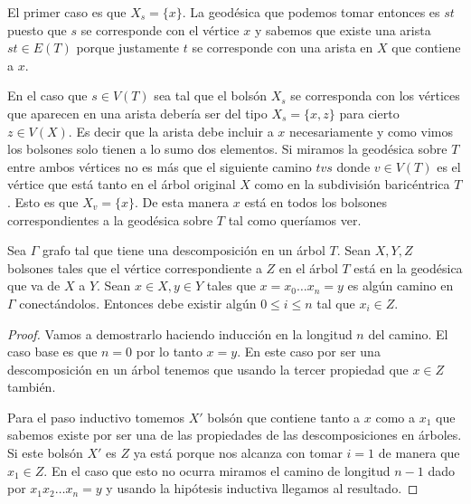 \documentclass[tesis.tex]{subfiles}
\begin{document}
\begin{obs}
\begin{enumerate}
	El primer caso es que $X_s = \{ x \}$.
	La geodésica que podemos tomar entonces es $st$ puesto que $s$ se corresponde con el vértice $x$ y sabemos que existe una arista $st \in E(T)$ porque justamente $t$ se corresponde con una arista en $X$ que contiene a $x$.
	
	En el caso que $s \in V(T)$ sea tal que el bolsón $X_s$ se corresponda con los vértices que aparecen en una arista debería ser del tipo $X_s = \{x,z\}$ para cierto $z \in V(X)$. 
	Es decir que la arista debe incluir a $x$ necesariamente y como vimos los bolsones solo tienen a lo sumo dos elementos.
	Si miramos la geodésica sobre $T$ entre ambos vértices no es más que el siguiente camino $tvs$ donde $v \in V(T)$ es el vértice que está tanto en el árbol original $X$ como en la subdivisión baricéntrica $T$.
	Esto es que $X_v = \{ x \}$.
	De esta manera $x$ está en todos los bolsones correspondientes a la geodésica sobre $T$ tal como queríamos ver.	
\end{enumerate}
\end{obs}



\begin{prop}\label{prop-camino-desc}
	Sea $\Gamma$ grafo tal que tiene una descomposición en un árbol $T$.
	Sean $X,Y,Z$ bolsones tales que el vértice correspondiente a $Z$ en el árbol $T$ está en la geodésica que va de $X$ a $Y$. 
	Sean $x \in X, y \in Y$ tales que $x = x_0 \dots x_n=y$ es algún camino en $\Gamma$ conectándolos.
	Entonces debe existir algún $ 0 \le i \le n$ tal que $x_i \in Z$. 
\end{prop}

\begin{proof}
	Vamos a demostrarlo haciendo inducción en la longitud $n$ del camino. 
	El caso base es que $n = 0$ por lo tanto $x=y$. 
	En este caso por ser una descomposición en un árbol tenemos que usando la tercer propiedad que $x \in Z$ también.
	
	Para el paso inductivo tomemos $X'$ bolsón que contiene tanto a $x$ como a $x_1$ que sabemos existe por ser una de las propiedades de las descomposiciones en árboles.
	Si este bolsón $X'$ es $Z$ ya está porque nos alcanza con tomar $i=1$ de manera que $x_1 \in Z$.
	En el caso que esto no ocurra miramos el camino de longitud $n-1$ dado por $x_1 x_2 \dots x_n = y$ y usando la hipótesis inductiva llegamos al resultado.	
\end{proof}
\end{document}
